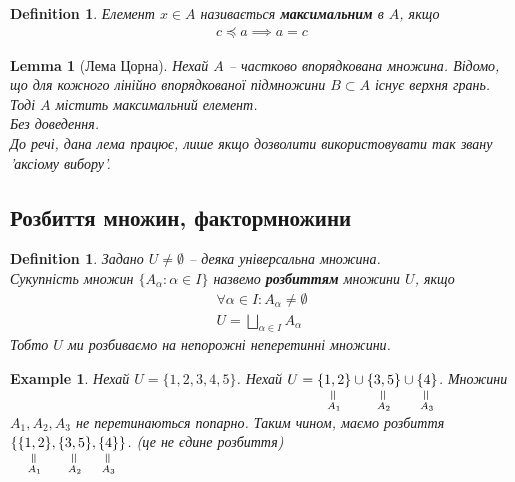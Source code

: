 \documentclass[a4paper, 14pt]{extarticle}
\def\huge{\displaystyle}
\theoremstyle{theoremdd}
\theoremstyle{theoremdd}
\newtheorem{definition}[theorem]{Definition}
\theoremstyle{theoremdd}
\theoremstyle{theoremdd}
\theoremstyle{theoremdd}
\newtheorem{example}[theorem]{Example}
\theoremstyle{theoremdd}
\theoremstyle{theoremdd}
\theoremstyle{theoremdd}
\theoremstyle{theoremdd}
\theoremstyle{theoremdd}
\theoremstyle{theoremdd}
\theoremstyle{theoremdd}
\theoremstyle{theoremdd}
\newtheorem{lemma}[theorem]{Lemma}
\theoremstyle{theoremdd}
\theoremstyle{theoremdd}
\begin{document}
\begin{definition}
Елемент $x \in A$ називається \textbf{максимальним} в $A$, якщо
\begin{align*}
c \preceq a \implies a = c
\end{align*}
\end{definition}

\begin{lemma}[Лема Цорна]
Нехай $A$ -- частково впорядкована множина. Відомо, що для кожного лінійно впорядкованої підмножини $B \subset A$ існує верхня грань. Тоді $A$ містить максимальний елемент.\\
\textit{Без доведення.}\\
\textit{До речі, дана лема працює, лише якщо дозволити використовувати так звану 'аксіому вибору'.}
\end{lemma}

\subsection{Розбиття множин, фактормножини}
\begin{definition}
Задано $U \neq \emptyset$ -- деяка універсальна множина.\\
Сукупність множин $\{A_{\alpha}: \alpha \in I\}$ назвемо \textbf{розбиттям} множини $U$, якщо
\begin{align*}
\forall \alpha \in I: A_\alpha \neq \emptyset\\
U = \huge\bigsqcup_{\alpha \in I} A_\alpha
\end{align*}
Тобто $U$ ми розбиваємо на непорожні неперетинні множини.
\end{definition}

\begin{example}
Нехай $U = \{1,2,3,4,5\}$. Нехай $U = \underset{\substack{\rotatebox{90}{=} \\ A_1}}{\{1,2\}} \cup \underset{\substack{\rotatebox{90}{=} \\ A_2}}{\{3,5\}} \cup \underset{\substack{\rotatebox{90}{=} \\ A_3}}{\{4\}}$. Множини $A_1,A_2,A_3$ не перетинаються попарно. Таким чином, маємо розбиття $\{\underset{\substack{\rotatebox{90}{=} \\ A_1}}{\{1,2\}}, \underset{\substack{\rotatebox{90}{=} \\ A_2}}{\{3,5\}}, \underset{\substack{\rotatebox{90}{=} \\ A_3}}{\{4\}} \}$. (це не єдине розбиття)
\end{example}
\end{document}

